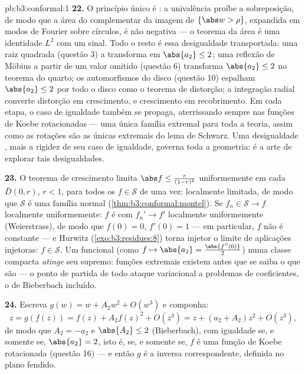\begin{solution}{pb:b3:conformal:1}
\textbf{22.} O princípio único é : a univalência
proíbe a sobreposição, de modo que a área do complementar da imagem
de $\{\abs w > \rho\}$, expandida em modos de Fourier sobre
círculos, é não negativa --- o teorema da área é uma identidade $L^2$
com um sinal. Todo o resto é essa desigualdade
transportada: uma raiz quadrada (questão 3) a transforma em
$\abs{a_2} \leq 2$; uma reflexão de Möbius a partir de um valor
omitido (questão 6) transforma $\abs{a_2} \leq 2$ no teorema do
quarto; os automorfismos do disco (questão 10) espalham $\abs{a_2}
\leq 2$ por todo o disco como o teorema de distorção;
a integração radial converte distorção em crescimento, e
crescimento em recobrimento. Em cada etapa, o caso de igualdade
também se propaga, aterrissando sempre nas funções de Koebe
rotacionadas --- uma única família extremal para toda a teoria, assim
como as rotações são as únicas extremais do lema de Schwarz.
Uma desigualdade , mais a rigidez de seu
caso de igualdade, governa toda a geometria:  é a arte de explorar tais desigualdades.

\textbf{23.} O teorema de crescimento limita $\abs f \leq
\frac{r}{(1-r)^2}$ uniformemente em cada $\bar D(0, r)$, $r <
1$, para todos os $f \in \mathcal S$ de uma vez: localmente limitada, de modo que
$\mathcal S$ é uma família normal
(\cref{thm:b3:conformal:montel}). Se $f_n \in \mathcal S \to
f$ localmente uniformemente: $f$ é  com $f_n' \to f'$
localmente uniformemente (Weierstrass), de modo que $f(0) = 0$, $f'(0) = 1$
--- em particular, $f$ não é constante --- e Hurwitz
(\cref{exo:b3:residues:8}) torna injetor o limite de aplicações
injetoras: $f \in \mathcal S$. Um funcional  (como
$f \mapsto \abs{a_2} = \frac{\abs{f''(0)}}2$) numa
classe compacta \emph{atinge} seu supremo: funções extremais
existem antes que se saiba o que são --- o
ponto de partida de todo ataque variacional a problemas de
coeficientes, o de Bieberbach incluído.

\textbf{24.} Escreva $g(w) = w + A_2w^2 + O(w^3)$ e componha:
\[
z = g(f(z)) = f(z) + A_2f(z)^2 + O(z^3)
= z + (a_2 + A_2)z^2 + O(z^3),
\]
de modo que $A_2 = -a_2$ e $\abs{A_2} \leq 2$ (Bieberbach), com
igualdade se, e somente se, $\abs{a_2} = 2$, isto é, se, e somente se, $f$ é uma função de Koebe
rotacionada (questão 16) --- e então $g$ é a
inversa correspondente, definida no plano fendido.


\end{solution}
